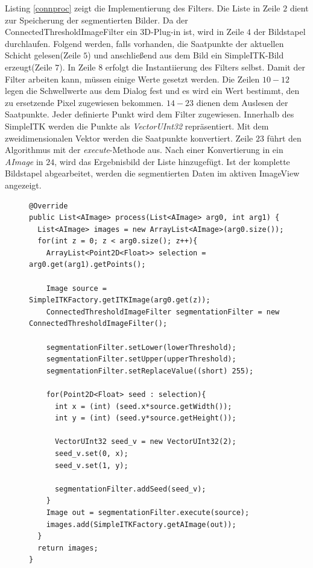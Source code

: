 Listing \ref{connproc} zeigt die Implementierung des Filters. Die Liste in Zeile $2$ dient zur Speicherung der segmentierten Bilder. Da der ConnectedThresholdImageFilter ein 3D-Plug-in ist, wird in Zeile $4$ der Bildstapel durchlaufen. Folgend werden, falls vorhanden, die Saatpunkte der aktuellen Schicht gelesen(Zeile $5$) und anschließend aus dem Bild ein SimpleITK-Bild erzeugt(Zeile $7$). In Zeile $8$ erfolgt die Instantiierung des Filters selbst. Damit der Filter arbeiten kann, müssen einige Werte gesetzt werden. Die Zeilen $10-12$ legen die Schwellwerte aus dem Dialog fest und es wird ein Wert bestimmt, den zu ersetzende Pixel zugewiesen bekommen. $14-23$ dienen dem Auslesen der Saatpunkte. Jeder definierte Punkt wird dem Filter zugewiesen. Innerhalb des SimpleITK werden die Punkte als \textit{VectorUInt32} repräsentiert. Mit dem zweidimensionalen Vektor werden die Saatpunkte konvertiert. Zeile $23$ führt den Algorithmus mit der \textit{execute}-Methode aus. Nach einer Konvertierung in ein \textit{AImage} in $24$, wird das Ergebnisbild der Liste hinzugefügt. Ist der komplette Bildstapel abgearbeitet, werden die segmentierten Daten im aktiven ImageView angezeigt.
\begin{figure}[htbp]
\begin{lstlisting}[frame=leftline]
@Override
public List<AImage> process(List<AImage> arg0, int arg1) {
  List<AImage> images = new ArrayList<AImage>(arg0.size());
  for(int z = 0; z < arg0.size(); z++){
    ArrayList<Point2D<Float>> selection = arg0.get(arg1).getPoints();
			
    Image source = SimpleITKFactory.getITKImage(arg0.get(z));
    ConnectedThresholdImageFilter segmentationFilter = new ConnectedThresholdImageFilter();
			
    segmentationFilter.setLower(lowerThreshold);
    segmentationFilter.setUpper(upperThreshold);
    segmentationFilter.setReplaceValue((short) 255);
			
    for(Point2D<Float> seed : selection){
      int x = (int) (seed.x*source.getWidth());
      int y = (int) (seed.y*source.getHeight());
				
      VectorUInt32 seed_v = new VectorUInt32(2);
      seed_v.set(0, x);
      seed_v.set(1, y);
				
      segmentationFilter.addSeed(seed_v);
    }
    Image out = segmentationFilter.execute(source);
    images.add(SimpleITKFactory.getAImage(out));
  }
  return images;
}
\end{lstlisting}
\end{figure}


